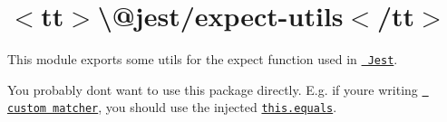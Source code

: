 \chapter{\texorpdfstring{$<$}{<}tt\texorpdfstring{$>$}{>}\textbackslash{}@jest/expect-\/utils\texorpdfstring{$<$}{<}/tt\texorpdfstring{$>$}{>}}
\hypertarget{md_pkiclassroomrescheduler_2src_2main_2frontend_2node__modules_2_0djest_2expect-utils_2_r_e_a_d_m_e}{}\label{md_pkiclassroomrescheduler_2src_2main_2frontend_2node__modules_2_0djest_2expect-utils_2_r_e_a_d_m_e}
\label{md_pkiclassroomrescheduler_2src_2main_2frontend_2node__modules_2_0djest_2expect-utils_2_r_e_a_d_m_e_autotoc_md1462}%
%
 This module exports some utils for the {\ttfamily expect} function used in \href{https://jestjs.io/}{\texttt{ Jest}}.

You probably don\textquotesingle{}t want to use this package directly. E.\+g. if you\textquotesingle{}re writing \href{https://jestjs.io/docs/expect\#expectextendmatchers}{\texttt{ custom matcher}}, you should use the injected \href{https://jestjs.io/docs/expect\#thisequalsa-b}{\texttt{ {\ttfamily this.\+equals}}}. 